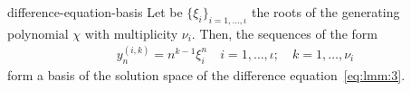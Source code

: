 \begin{Theorem}{difference-equation-basis}
  Let be $\{\xi_i\}_{i=1,\dots,\iota}$ the roots of the
  generating polynomial $\chi$ with multiplicity $\nu_i$. Then,
  the sequences of the form
  \begin{gather}
    \label{eq:lmm:6}
    y^{(i,k)}_n = n^{k-1}\xi_i^n
    \quad i=1,\dots,\iota; \quad k = 1,\dots,\nu_i
  \end{gather}
  form a basis of the solution space of the difference
  equation~\eqref{eq:lmm:3}.
\end{Theorem}


